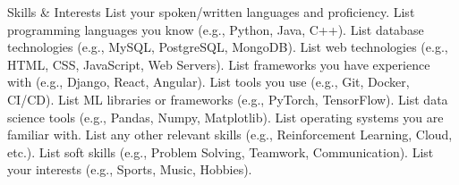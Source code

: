 
\begin{rubric}{Skills \& Interests}
\entry*[Languages]
	List your spoken/written languages and proficiency.
\entry*[Coding]
	List programming languages you know (e.g., Python, Java, C++).
\entry*[Databases]
	List database technologies (e.g., MySQL, PostgreSQL, MongoDB).
	List web technologies (e.g., HTML, CSS, JavaScript, Web Servers).
\entry*[Frameworks]
	List frameworks you have experience with (e.g., Django, React, Angular).
\entry*[Tools]
	List tools you use (e.g., Git, Docker, CI/CD).
	List ML libraries or frameworks (e.g., PyTorch, TensorFlow).
	List data science tools (e.g., Pandas, Numpy, Matplotlib).
	List operating systems you are familiar with.
\entry*[Other]
	List any other relevant skills (e.g., Reinforcement Learning, Cloud, etc.).
\entry*[Soft]
	List soft skills (e.g., Problem Solving, Teamwork, Communication).
\entry*[Interests]
	List your interests (e.g., Sports, Music, Hobbies).
\end{rubric}

